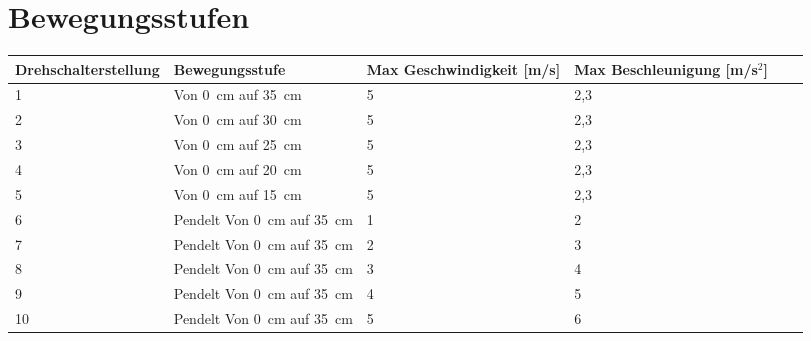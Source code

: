 %
%

\chapter{Bewegungsstufen} \label{bew}


\fontsize{8}{10}\selectfont
\begin{tabularx}{\textwidth}{|p{3cm}|X|X|X|p{1cm}|X|}
	\hline 
	\textbf{Drehschalterstellung}  & \textbf{Bewegungsstufe} & \textbf{Max Geschwindigkeit [m/s]} &  \textbf{Max Beschleunigung [m/s$^{2}$]} \\ \hline
	1 & Von 0\ cm auf 35\ cm & 5 & 2,3   \\
	\hline
	2 & Von 0\ cm auf 30\ cm & 5 & 2,3 \\
	\hline
	3 & Von 0\ cm auf 25\ cm & 5 & 2,3 \\
	\hline
	4 & Von 0\ cm auf 20\ cm & 5 & 2,3 \\
	\hline
	5 & Von 0\ cm auf 15\ cm & 5 & 2,3 \\
	\hline
	6 & Pendelt Von 0\ cm auf 35\ cm & 1 & 2 \\
	\hline
	7 &Pendelt Von 0\ cm auf 35\ cm & 2 & 3 \\
	\hline
	8 & Pendelt Von 0\ cm auf 35\ cm & 3 & 4 \\
	\hline
	9 & Pendelt Von 0\ cm auf 35\ cm & 4 & 5 \\
	\hline
	10 & Pendelt Von 0\ cm auf 35\ cm & 5 & 6 \\
	\hline
	
	
\end{tabularx}

